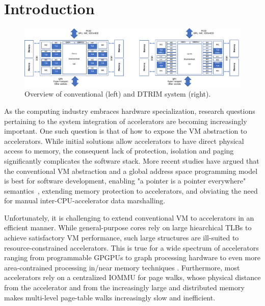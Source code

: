 \section{Introduction}
\label{sec:intro}

\begin{figure}
\centering
 \includegraphics[width=1\textwidth,clip]{figures/overview.pdf}
 \caption{Overview of conventional (left) and DTRIM system (right).}
\label{fig:overview}
\end{figure}

As the computing industry embraces hardware specialization, research
questions pertaining to the system integration of accelerators are
becoming increasingly important. One such question is that of how to
expose the VM abstraction to accelerators. While initial solutions
allow accelerators to have direct physical access to memory, the
consequent lack of protection, isolation and paging significantly
complicates the software stack. More recent studies have argued that
the conventional VM abstraction and a global address space programming
model is best for software development, enabling "a pointer is a
pointer everywhere" semantics~\cite{pichai:architectural,
  power:supporting, haria:devirtualizing, vesely:observation,
  ausavarungnirun:mosaic}, extending memory protection to
accelerators, and obviating the need for manual inter-CPU-accelerator
data marshalling.

Unfortunately, it is challenging to extend conventional VM to
accelerators in an efficient manner. While general-purpose cores rely
on large hiearchical TLBs to achieve satisfactory VM performance, such
large structures are ill-suited to resource-constrained
accelerators. This is true for a wide spectrum of accelerators ranging
from programmable GPGPUs \cite{pichai:architectural, power:supporting}
to graph processing hardware \cite{haria:devirtualizing} to even more
area-contrained processing in/near memory techniques
\cite{picorel:near-memory}. Furthermore, most accelerators rely on a centralized 
IOMMU for page walks, whose physical distance from the accelerator and from the increasingly 
large and distributed memory makes multi-level page-table walks increasingly slow and inefficient. 


